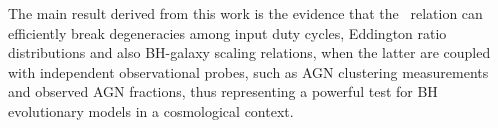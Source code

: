 The main result derived from this work is the evidence that the \LXMS\ relation can
efficiently break degeneracies among input duty cycles, Eddington ratio distributions and
also BH-galaxy scaling relations, when the latter are coupled with independent
observational probes, such as AGN clustering measurements \citep{ShankarNat} and observed
AGN fractions, thus representing a powerful test for BH evolutionary models in a cosmological
context.
